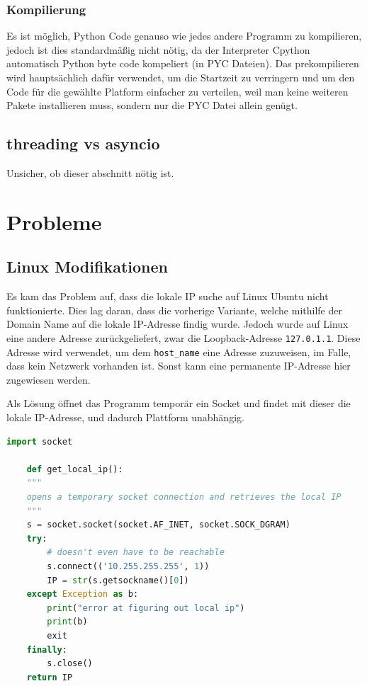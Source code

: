 \subsubsection{Kompilierung}
Es ist möglich, Python Code genauso wie jedes andere Programm zu kompilieren,
jedoch ist dies standardmäßig nicht nötig, 
da der Interpreter Cpython automatisch Python byte code kompeliert (in PYC Dateien).
Das prekompilieren wird hauptsächlich dafür verwendet, 
um die Startzeit zu verringern 
und um den Code für die gewählte Platform einfacher zu verteilen,
weil man keine weiteren Pakete installieren muss, 
sondern nur die PYC Datei allein genügt.

\subsection{threading vs asyncio}
Unsicher, ob dieser abschnitt nötig ist.

\section{Probleme}
\subsection{Linux Modifikationen}
Es kam das Problem auf, 
dass die lokale IP suche auf Linux Ubuntu nicht funktionierte.
Dies lag daran, dass die vorherige Variante, 
welche mithilfe der Domain Name auf die lokale IP-Adresse findig wurde.
Jedoch wurde auf Linux eine andere Adresse zurückgeliefert, 
zwar die Loopback-Adresse \texttt{127.0.1.1}. 
Diese Adresse wird verwendet, um dem \texttt{host\_name} eine Adresse zuzuweisen,
im Falle, dass kein Netzwerk vorhanden ist. 
Sonst kann eine permanente IP-Adresse hier zugewiesen werden.

Als Lösung öffnet das Programm temporär ein Socket 
und findet mit dieser die lokale IP-Adresse, und dadurch Plattform unabhängig.
\begin{lstlisting}[language=python, gobble=4]
    import socket

    def get_local_ip():
    """
    opens a temporary socket connection and retrieves the local IP
    """
    s = socket.socket(socket.AF_INET, socket.SOCK_DGRAM)
    try:
        # doesn't even have to be reachable
        s.connect(('10.255.255.255', 1))
        IP = str(s.getsockname()[0])
    except Exception as b:
        print("error at figuring out local ip")
        print(b)
        exit
    finally:
        s.close()
    return IP
\end{lstlisting}

